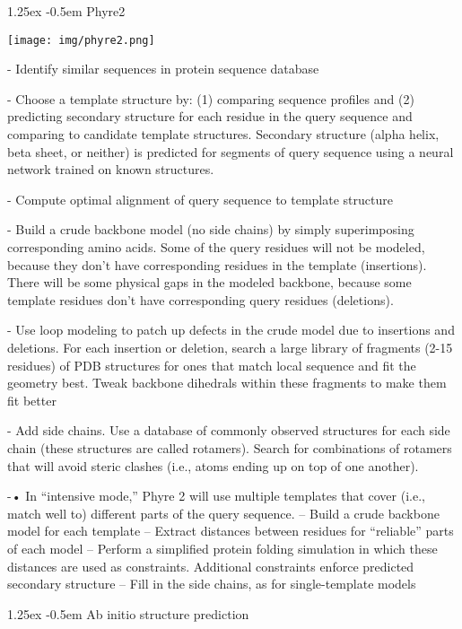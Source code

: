 \documentclass[8pt]{article}
\makeatletter
\newlength{\norm}
\newlength{\nrm}
\renewcommand{\paragraph}{%
  \@startsection{paragraph}{4}%
  {\z@}{1.25ex \@plus 2pt \@minus 2pt}{-0.5em}%
  {\fontsize{\f@size}{\nrm}\normalfont\bfseries}%
}
\makeatother
\begin{document}
\paragraph{Phyre2} 

\texttt{[image: img/phyre2.png]}

- Identify  similar sequences in  
protein sequence  database

- Choose	a	template	
structure	by:	
(1)	comparing	sequence	
profiles	and		
(2)	predicting	secondary	
structure	for	each	residue	
in	the	query	sequence	
and	comparing	to	
candidate	template	
structures.		Secondary	
structure	(alpha	helix,	
beta	sheet,	or	neither)	is	
predicted	for	segments	of	
query	sequence	using	a	
neural	network	trained	on	
known	structures.

- Compute	optimal	
alignment	of	query	
sequence	to	template	
structure

- Build	a	crude	backbone	model	(no	side	chains)	by	simply	superimposing	
corresponding	amino	acids.		Some	of	the	query	residues	will	not	be	modeled,	
because	they	don’t	have	corresponding	residues	in	the	template	(insertions).		
There	will	be	some	physical	gaps	in	the	modeled	backbone,	because	some	
template	residues	don’t	have	corresponding	query	residues	(deletions).

- Use	loop	modeling	to	patch	up	defects	in	the	crude	model	due	to	insertions	and	
deletions.		For	each	insertion	or	deletion,	search	a	large	library	of	fragments	(2-15	
residues)	of	PDB	structures	for	ones	that	match	local	sequence	and	fit	the	
geometry	best.		Tweak	backbone	dihedrals	within	these	fragments	to	make	them	
fit	better

- Add	side	chains.		Use	a	
database	of	commonly	
observed	structures	for	each	
side	chain	(these	structures	
are	called	rotamers).		Search	
for	combinations	of	
rotamers	that	will	avoid	
steric	clashes	(i.e.,	atoms	
ending	up	on	top	of	one	
another).

-• In “intensive mode,” Phyre
2 will use multiple templates
that cover (i.e., match well
to) different parts of the
query sequence.
– Build a crude backbone
model for each template
– Extract distances between
residues for “reliable” parts
of each model
– Perform a simplified protein
folding simulation in which
these distances are used as
constraints. Additional
constraints enforce predicted
secondary structure
– Fill in the side chains, as for
single-template models 

\paragraph{Ab initio structure prediction}
\end{document}
